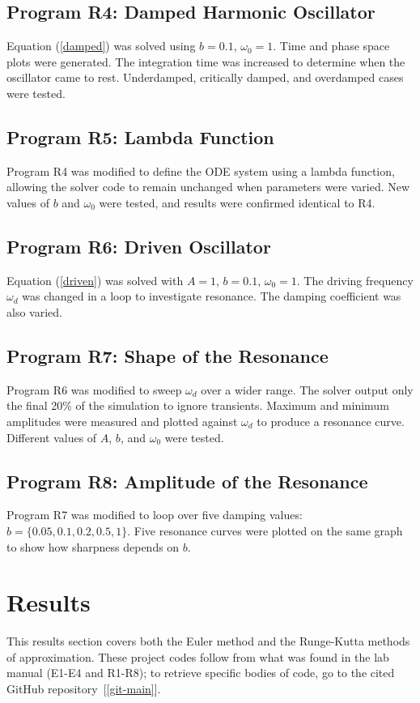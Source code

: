 \documentclass[12pt,a4paper]{article}
\begin{document}
	\subsection*{Program R4: Damped Harmonic Oscillator}
	Equation (\ref{damped}) was solved using \(b = 0.1\), \(\omega_0 = 1\). Time and phase space plots were generated. The integration time was increased to determine when the oscillator came to rest. Underdamped, critically damped, and overdamped cases were tested.
	
	\subsection*{Program R5: Lambda Function}
	Program R4 was modified to define the ODE system using a lambda function, allowing the solver code to remain unchanged when parameters were varied. New values of \(b\) and \(\omega_0\) were tested, and results were confirmed identical to R4.
	
	\subsection*{Program R6: Driven Oscillator}
	Equation (\ref{driven}) was solved with \(A = 1\), \(b = 0.1\), \(\omega_0 = 1\). The driving frequency \(\omega_d\) was changed in a loop to investigate resonance. The damping coefficient was also varied.
	
	\subsection*{Program R7: Shape of the Resonance}
	Program R6 was modified to sweep \(\omega_d\) over a wider range. The solver output only the final 20\% of the simulation to ignore transients. Maximum and minimum amplitudes were measured and plotted against \(\omega_d\) to produce a resonance curve. Different values of \(A\), \(b\), and \(\omega_0\) were tested.
	
	\subsection*{Program R8: Amplitude of the Resonance}
	Program R7 was modified to loop over five damping values: \(b = \{0.05, 0.1, 0.2, 0.5, 1\}\). Five resonance curves were plotted on the same graph to show how sharpness depends on \(b\).
	\clearpage
	\section{Results}
	This results section covers both the Euler method and the Runge-Kutta methods of approximation. These project codes follow from what was found in the lab manual (E1-E4 and R1-R8); to retrieve specific bodies of code, go to the cited GitHub repository~[\ref{git-main}].
	
\end{document}
